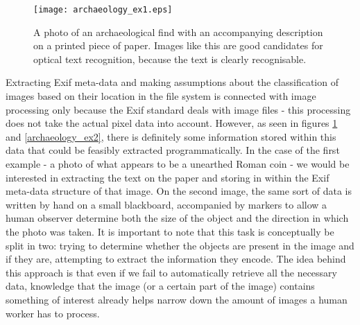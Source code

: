 \documentclass [12pt,a4paper]{report}
\begin{document}
\begin{center}
\begin{figure}[h]
\centering
\texttt{[image: archaeology\_ex1.eps]} %
\caption[A photo of an archaeological find]{A photo of an archaeological find with an accompanying description on a printed piece of paper. Images like this are good candidates for optical text recognition, because the text is clearly recognisable.}
\label{archaeology_ex1}
\end{figure}
\end{center}

Extracting Exif meta-data and making assumptions about the classification of images based on their location in the file system is connected with image processing only because the Exif standard deals with image files - this processing does not take the actual pixel data into account. However, as seen in figures \ref{archaeology_ex1} and \ref{archaeology_ex2}, there is definitely some information stored within this data that could be feasibly extracted programmatically. In the case of the first example - a photo of what appears to be a unearthed Roman coin - we would be interested in extracting the text on the paper and storing in within the Exif meta-data structure of that image. On the second image, the same sort of data is written by hand on a small blackboard, accompanied by markers to allow a human observer determine both the size of the object and the direction in which the photo was taken. It is important to note that this task is conceptually be split in two: trying to determine whether the objects are present in the image and if they are, attempting to extract the information they encode. The idea behind this approach is that even if we fail to automatically retrieve all the necessary data, knowledge that the image (or a certain part of the image) contains something of interest already helps narrow down the amount of images a human worker has to process.
\end{document}
